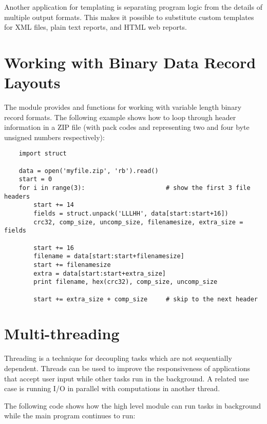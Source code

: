 \documentclass{manual}
\begin{document}
Another application for templating is separating program logic from the
details of multiple output formats.  This makes it possible to substitute
custom templates for XML files, plain text reports, and HTML web reports.


\section{Working with Binary Data Record Layouts\label{binary-formats}}

The  module provides
 and  functions for working with
variable length binary record formats.  The following example shows how
to loop through header information in a ZIP file (with pack codes
 and  representing two and four byte unsigned
numbers respectively):

\begin{verbatim}
    import struct

    data = open('myfile.zip', 'rb').read()
    start = 0
    for i in range(3):                      # show the first 3 file headers
        start += 14
        fields = struct.unpack('LLLHH', data[start:start+16])
        crc32, comp_size, uncomp_size, filenamesize, extra_size = fields

        start += 16
        filename = data[start:start+filenamesize]
        start += filenamesize
        extra = data[start:start+extra_size]
        print filename, hex(crc32), comp_size, uncomp_size

        start += extra_size + comp_size     # skip to the next header
\end{verbatim}


\section{Multi-threading\label{multi-threading}}

Threading is a technique for decoupling tasks which are not sequentially
dependent.  Threads can be used to improve the responsiveness of
applications that accept user input while other tasks run in the
background.  A related use case is running I/O in parallel with
computations in another thread.

The following code shows how the high level
 module can run
tasks in background while the main program continues to run:
\end{document}
